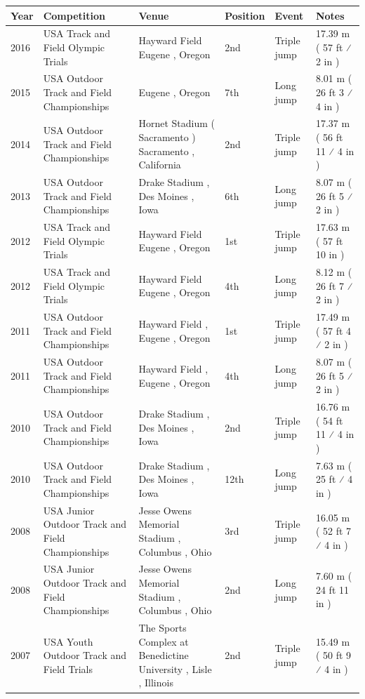 \documentclass{article}
\begin{document}
\begin{tabular}{llllll}
\toprule
Year & Competition & Venue & Position & Event & Notes \\
\midrule
2016 & USA Track and Field Olympic Trials & Hayward Field Eugene , Oregon & 2nd & Triple jump & 17.39 m ( 57 ft ⁄ 2 in ) \\
2015 & USA Outdoor Track and Field Championships & Eugene , Oregon & 7th & Long jump & 8.01 m ( 26 ft 3 ⁄ 4 in ) \\
2014 & USA Outdoor Track and Field Championships & Hornet Stadium ( Sacramento ) Sacramento , California & 2nd & Triple jump & 17.37 m ( 56 ft 11 ⁄ 4 in ) \\
2013 & USA Outdoor Track and Field Championships & Drake Stadium , Des Moines , Iowa & 6th & Long jump & 8.07 m ( 26 ft 5 ⁄ 2 in ) \\
2012 & USA Track and Field Olympic Trials & Hayward Field Eugene , Oregon & 1st & Triple jump & 17.63 m ( 57 ft 10 in ) \\
2012 & USA Track and Field Olympic Trials & Hayward Field Eugene , Oregon & 4th & Long jump & 8.12 m ( 26 ft 7 ⁄ 2 in ) \\
2011 & USA Outdoor Track and Field Championships & Hayward Field , Eugene , Oregon & 1st & Triple jump & 17.49 m ( 57 ft 4 ⁄ 2 in ) \\
2011 & USA Outdoor Track and Field Championships & Hayward Field , Eugene , Oregon & 4th & Long jump & 8.07 m ( 26 ft 5 ⁄ 2 in ) \\
2010 & USA Outdoor Track and Field Championships & Drake Stadium , Des Moines , Iowa & 2nd & Triple jump & 16.76 m ( 54 ft 11 ⁄ 4 in ) \\
2010 & USA Outdoor Track and Field Championships & Drake Stadium , Des Moines , Iowa & 12th & Long jump & 7.63 m ( 25 ft ⁄ 4 in ) \\
2008 & USA Junior Outdoor Track and Field Championships & Jesse Owens Memorial Stadium , Columbus , Ohio & 3rd & Triple jump & 16.05 m ( 52 ft 7 ⁄ 4 in ) \\
2008 & USA Junior Outdoor Track and Field Championships & Jesse Owens Memorial Stadium , Columbus , Ohio & 2nd & Long jump & 7.60 m ( 24 ft 11 in ) \\
2007 & USA Youth Outdoor Track and Field Trials & The Sports Complex at Benedictine University , Lisle , Illinois & 2nd & Triple jump & 15.49 m ( 50 ft 9 ⁄ 4 in ) \\
\bottomrule
\end{tabular}
\end{document}

